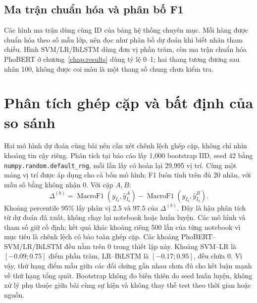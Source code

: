 \subsection{Ma trận chuẩn hóa và phân bố F1}
Các hình ma trận dùng cùng ID của bảng hệ thống chuyên mục. Mỗi hàng được chuẩn hóa theo số mẫu lớp, nên đọc như phân bố dự đoán khi biết nhãn tham chiếu. Hình SVM/LR/BiLSTM dùng đơn vị phần trăm, còn ma trận chuẩn hóa PhoBERT ở chương~\ref{chap:results} dùng tỷ lệ 0--1; hai thang tương đương sau nhân 100, không được coi màu là một thang số chung chưa kiểm tra.

\section{Phân tích ghép cặp và bất định của so sánh}
\label{sec:paired_comparison}
Hai mô hình dự đoán cùng bài nên cần xét chênh lệch ghép cặp, không chỉ nhìn khoảng tin cậy riêng. Phân tích tại báo cáo lấy 1,000 bootstrap IID, seed 42 bằng \texttt{numpy.random.default\_rng}, mỗi lần lấy có hoàn lại 29,995 vị trí. Cùng một mảng vị trí được áp dụng cho cả bốn mô hình; F1 luôn tính trên đủ 20 nhãn, với mẫu số bằng không nhận 0. Với cặp $A,B$:
\begin{equation}
\Delta^{(b)}=\operatorname{MacroF1}(y_{I_b},\hat y^A_{I_b})-
\operatorname{MacroF1}(y_{I_b},\hat y^B_{I_b}).
\end{equation}
Khoảng percentile 95\% lấy phân vị 2.5 và 97.5 của $\Delta^{(b)}$. Đây là hậu phân tích từ dự đoán đã xuất, không chạy lại notebook hoặc huấn luyện. Các mô hình và tham số giữ cố định; kết quả khác khoảng riêng 500 lần của từng notebook vì mục tiêu là chênh lệch có bảo toàn ghép cặp.
Các khoảng PhoBERT--SVM/LR/BiLSTM đều nằm trên 0 trong thiết lập này. Khoảng SVM--LR là $[-0.09;0.75]$ điểm phần trăm, LR--BiLSTM là $[-0.17;0.95]$, đều chứa 0. Vì vậy, thứ hạng điểm mẫu giữa các đối chứng gần nhau chưa đủ cho kết luận mạnh về thứ hạng tổng quát. Bootstrap không đo biến thiên do seed huấn luyện, không xử lý phụ thuộc giữa bài cùng sự kiện và không thay thế test theo thời gian hoặc nguồn.

